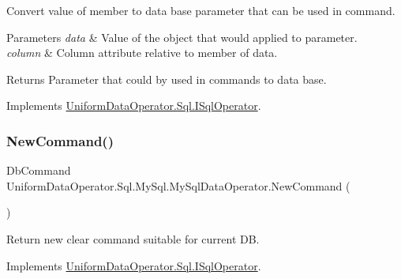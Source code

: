 Convert value of member to data base parameter that can be used in command. 


\begin{DoxyParams}{Parameters}
{\em data} & Value of the object that would applied to parameter.\\
\hline
{\em column} & Column attribute relative to member of data.\\
\hline
\end{DoxyParams}
\begin{DoxyReturn}{Returns}
Parameter that could by used in commands to data base.
\end{DoxyReturn}


Implements \mbox{\hyperlink{interface_uniform_data_operator_1_1_sql_1_1_i_sql_operator_aa122fe55f022891be5a888ff49e6eddd}{Uniform\+Data\+Operator.\+Sql.\+I\+Sql\+Operator}}.

\mbox{\label{class_uniform_data_operator_1_1_sql_1_1_my_sql_1_1_my_sql_data_operator_af5850bfb38f7dfcd5acd5157458ef4bd}} 
\subsubsection{\texorpdfstring{New\+Command()}{NewCommand()}\hspace{0.1cm}{\footnotesize\ttfamily [1/2]}}
{\footnotesize\ttfamily Db\+Command Uniform\+Data\+Operator.\+Sql.\+My\+Sql.\+My\+Sql\+Data\+Operator.\+New\+Command (\begin{DoxyParamCaption}{ }\end{DoxyParamCaption})}



Return new clear command suitable for current DB. 



Implements \mbox{\hyperlink{interface_uniform_data_operator_1_1_sql_1_1_i_sql_operator_afc0fd8b8c82515c498a6959453f331f1}{Uniform\+Data\+Operator.\+Sql.\+I\+Sql\+Operator}}.

\mbox{\label{class_uniform_data_operator_1_1_sql_1_1_my_sql_1_1_my_sql_data_operator_a6c2e2d374072c275953a515379963881}} 
